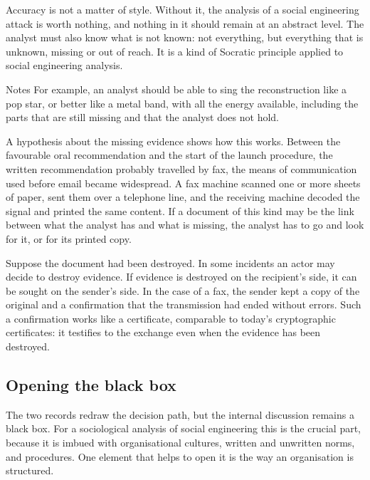 Accuracy is not a matter of style. Without it, the analysis of a social engineering attack is worth nothing, and nothing in it should remain at an abstract level. The analyst must also know what is not known: not everything, but everything that is unknown, missing or out of reach. It is a kind of Socratic principle applied to social engineering analysis.

\begin{nota}{Notes}
	For example, an analyst should be able to sing the reconstruction like a pop star, or better like a metal band, with all the energy available, including the parts that are still missing and that the analyst does not hold.
\end{nota}

A hypothesis about the missing evidence shows how this works. Between the favourable oral recommendation and the start of the launch procedure, the written recommendation probably travelled by fax, the means of communication used before email became widespread. A fax machine scanned one or more sheets of paper, sent them over a telephone line, and the receiving machine decoded the signal and printed the same content. If a document of this kind may be the link between what the analyst has and what is missing, the analyst has to go and look for it, or for its printed copy.

Suppose the document had been destroyed. In some incidents an actor may decide to destroy evidence. If evidence is destroyed on the recipient's side, it can be sought on the sender's side. In the case of a fax, the sender kept a copy of the original and a confirmation that the transmission had ended without errors. Such a confirmation works like a certificate, comparable to today's cryptographic certificates: it testifies to the exchange even when the evidence has been destroyed.

\subsection{Opening the black box}
The two records redraw the decision path, but the internal discussion remains a black box. For a sociological analysis of social engineering this is the crucial part, because it is imbued with organisational cultures, written and unwritten norms, and procedures. One element that helps to open it is the way an organisation is structured.

